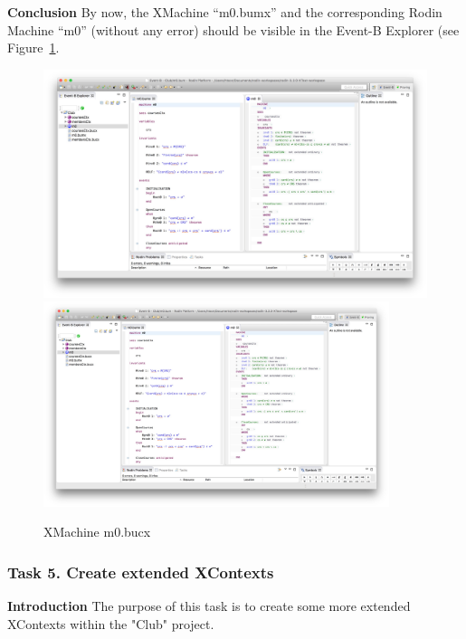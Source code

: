 \textbf{Conclusion} By now, the XMachine ``m0.bumx'' and the corresponding Rodin Machine ``m0'' (without any error) should be visible in the Event-B Explorer (see Figure~\ref{fig:M0}.
  \begin{figure}[!htbp]
    \centering
    \ifplastex
    \includegraphics[width=512]{figures/M0}
    \else
    \includegraphics[width=0.9\textwidth]{figures/M0}
    \fi
    \caption{XMachine m0.bucx}
    \label{fig:M0}
  \end{figure}

\subsubsection{Task 5. Create extended XContexts}
\textbf{Introduction} The purpose of this task is to create some more extended XContexts within the "Club" project.

